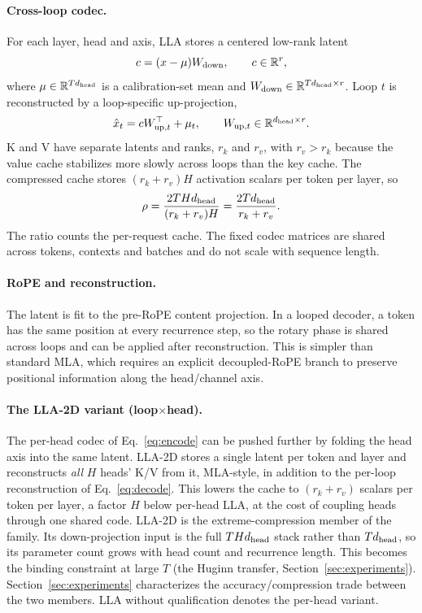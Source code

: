 \documentclass[10pt]{article}
\newcommand{\lla}{LLA}
\begin{document}
\paragraph{Cross-loop codec.}
For each layer, head and axis, \lla{} stores a centered low-rank latent
\begin{equation}
  c = (x-\mu)W_{\rm down}, \qquad c\in\mathbb{R}^{r},
  \label{eq:encode}
\end{equation}
where $\mu\in\mathbb{R}^{Td_{\rm head}}$ is a calibration-set mean and $W_{\rm down}\in\mathbb{R}^{Td_{\rm head}\times r}$. Loop $t$ is reconstructed by a loop-specific up-projection,
\begin{equation}
  \hat{x}_t = c W_{{\rm up},t}^{\top}+\mu_t, \qquad W_{{\rm up},t}\in\mathbb{R}^{d_{\rm head}\times r} .
  \label{eq:decode}
\end{equation}
K and V have separate latents and ranks, $r_k$ and $r_v$, with $r_v > r_k$ because the value cache stabilizes more slowly across loops than the key cache. The compressed cache stores $(r_k+r_v)H$ activation scalars per token per layer, so
\begin{equation}
  \rho = \frac{2THd_{\rm head}}{(r_k+r_v)H} = \frac{2T d_{\rm head}}{r_k+r_v} .
  \label{eq:ratio}
\end{equation}
The ratio counts the per-request cache. The fixed codec matrices are shared across tokens, contexts and batches and do not scale with sequence length.

\paragraph{RoPE and reconstruction.}
The latent is fit to the pre-RoPE content projection. In a looped decoder, a token has the same position at every recurrence step, so the rotary phase \citep{roformer2021} is shared across loops and can be applied after reconstruction. This is simpler than standard MLA, which requires an explicit decoupled-RoPE branch to preserve positional information along the head/channel axis.

\paragraph{The \lla{}-2D variant (loop$\times$head).}
The per-head codec of Eq.~\eqref{eq:encode} can be pushed further by folding the head axis into the same latent. \lla{}-2D stores a single latent per token and layer and reconstructs \emph{all} $H$ heads' K/V from it, MLA-style, in addition to the per-loop reconstruction of Eq.~\eqref{eq:decode}. This lowers the cache to $(r_k+r_v)$ scalars per token per layer, a factor $H$ below per-head \lla{}, at the cost of coupling heads through one shared code. \lla{}-2D is the extreme-compression member of the family. Its down-projection input is the full $THd_{\rm head}$ stack rather than $Td_{\rm head}$, so its parameter count grows with head count and recurrence length. This becomes the binding constraint at large $T$ (the Huginn transfer, Section~\ref{sec:experiments}). Section~\ref{sec:experiments} characterizes the accuracy/compression trade between the two members. \lla{} without qualification denotes the per-head variant.
\end{document}
